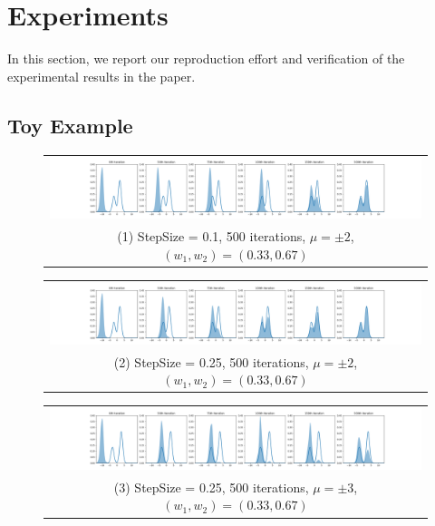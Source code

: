 \section{Experiments}
In this section, we report our reproduction effort and verification of the experimental results in the paper.

\subsection{Toy Example}

\begin{figure}[!htbp]
    \centering
    \begin{tabular}{@{}c@{}}
        \includegraphics[width=\textwidth]{figs/toy-figure1_step0.1_mu2.0_w0.33_gaussian.png} \\
        \small (1) StepSize = 0.1, 500 iterations, $\mu = \pm 2$, $(w_1, w_2) = (0.33, 0.67)$
    \end{tabular}
    
    \begin{tabular}{@{}c@{}}
        \includegraphics[width=\textwidth]{figs/toy-figure1.png} \\
        \small (2) StepSize = 0.25, 500 iterations, $\mu = \pm 2$, $(w_1, w_2) = (0.33, 0.67)$
    \end{tabular}
    
    \begin{tabular}{@{}c@{}}
        \includegraphics[width=\textwidth]{figs/toy-figure1_step0.25_mu3.0_w0.33_gaussian.png} \\
        \small (3) StepSize = 0.25, 500 iterations, $\mu = \pm 3$, $(w_1, w_2) = (0.33, 0.67)$
    \end{tabular}
    

\end{figure}
